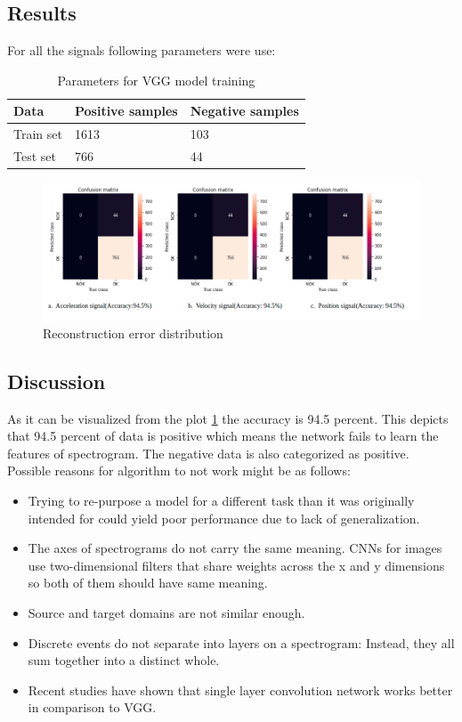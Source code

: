     
    \subsection{Results}
    For all the signals following parameters were use:
    \begin{table}[h]
    	\centering
    	\begin{tabular}{|l|l|l|}
    		\hline
    		Data      & Positive samples & Negative samples \\ \hline
    		Train set & 1613             & 103              \\ \hline
    		Test set  & 766              & 44               \\ \hline
    	\end{tabular}
    	\caption{Parameters for VGG model training}
 
    \end{table}
     \begin{figure}[h]
     	\centering
     	\includegraphics[width=1.2\linewidth]{images/rr5.png}
     	\caption{Reconstruction error distribution}
     	\label{k}
     	
     \end{figure}
    
    \subsection{Discussion}
    As it can be visualized from the plot \ref{k} the accuracy is 94.5 percent. This depicts that 94.5 percent of data is positive which means the network fails to learn the features of spectrogram. The negative data is also categorized as positive. Possible reasons for algorithm to not work might be as follows:
    \begin{itemize}
    	\item  Trying to re-purpose a model for a different task than it was originally intended for could yield poor performance due to lack of generalization.
    	\item The axes of spectrograms do not carry the same meaning. CNNs for images use two-dimensional filters that share weights across the x and y dimensions so both of them should have same meaning.
    	\item Source and target domains are not similar enough.
    	\item Discrete events do not separate into layers on a spectrogram: Instead, they all sum together into a distinct whole.
    	\item Recent studies \cite{pons2017timbre} have shown that single layer convolution network works better in comparison to VGG.
    \end{itemize}
   
